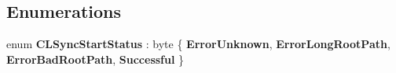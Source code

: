 \subsection*{Enumerations}
\begin{DoxyCompactItemize}
\item 
enum {\bfseries C\-L\-Sync\-Start\-Status} \-: byte \{ {\bfseries Error\-Unknown}, 
{\bfseries Error\-Long\-Root\-Path}, 
{\bfseries Error\-Bad\-Root\-Path}, 
{\bfseries Successful}
 \}
\end{DoxyCompactItemize}
